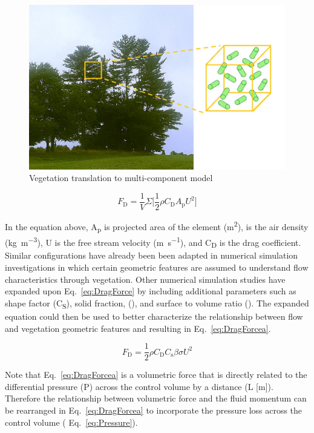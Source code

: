 \documentclass[12pt]{article}
\begin{document}
\begin{figure} [h]
	\centering 	\includegraphics[width=1.0\linewidth]{Picture1.jpg}
	\caption{Vegetation translation to multi-component model}
	\label{fig:Canopymod}
\end{figure}

\begin{equation}\label{eq:DragForce}
F_{\mathrm{D}} =\frac{1}{V} \Sigma \Big[ \frac{1}{2} \rho C_{\mathrm{D}} A_{\mathrm{p}} {U}^2 \Big] 
\end{equation} 

In the equation above,  A\textsubscript{p} is projected area of the element (\si{m^{2}}),  {\textrho} is the air density (\si{kg.m^{-3}}), U is the free stream velocity (\si{m.s^{-1}}), and C\textsubscript{D} is the drag coefficient.  Similar configurations have already been been adapted in numerical simulation investigations \cite{Pimont2009, Dupont2008}  in which certain geometric features are assumed to understand flow characteristics through vegetation. Other numerical simulation studies \cite{Mueller2014}  have expanded upon Eq.~\ref{eq:DragForce} by including additional parameters such as shape factor (C\textsubscript{S}), solid fraction, (\textbeta), and surface to volume ratio (\textsigma  [\si{m^{-1}}]). The expanded equation could then be used to better characterize the relationship between flow and vegetation geometric features and resulting in Eq.~\ref{eq:DragForcea}.

\begin{equation}\label{eq:DragForcea}
F_{\mathrm{D}}  = \frac{1}{2} \rho C_{\mathrm{D}} C_{\mathrm{s}} \beta \sigma {U}^2
\end{equation} 

\noindent Note that Eq.~\ref{eq:DragForcea} is a volumetric force that is directly related to the differential pressure (\textDelta P) across the control volume by a distance (L [\si{m}]). Therefore the relationship between volumetric force and the fluid momentum can be rearranged in Eq.~\ref{eq:DragForcea} to incorporate the pressure loss across the control volume ( Eq.~\ref{eq:Pressure}).
\end{document}
